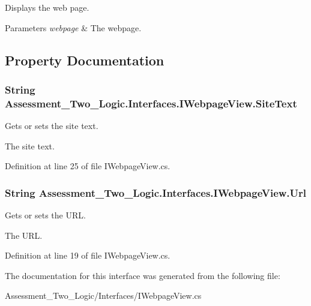Displays the web page. 


\begin{DoxyParams}{Parameters}
{\em webpage} & The webpage.\\
\hline
\end{DoxyParams}


\subsection{Property Documentation}
\hypertarget{interface_assessment___two___logic_1_1_interfaces_1_1_i_webpage_view_af20fba7f4d0ebaa5ac4dd52a4773e784}{
\subsubsection[{SiteText}]{\setlength{\rightskip}{0pt plus 5cm}String Assessment\_\-Two\_\-Logic.Interfaces.IWebpageView.SiteText}}
\label{interface_assessment___two___logic_1_1_interfaces_1_1_i_webpage_view_af20fba7f4d0ebaa5ac4dd52a4773e784}


Gets or sets the site text. 

The site text.

Definition at line 25 of file IWebpageView.cs.

\hypertarget{interface_assessment___two___logic_1_1_interfaces_1_1_i_webpage_view_acd1fa4bb8ce9b39bac77fcb9568a9f52}{
\subsubsection[{Url}]{\setlength{\rightskip}{0pt plus 5cm}String Assessment\_\-Two\_\-Logic.Interfaces.IWebpageView.Url}}
\label{interface_assessment___two___logic_1_1_interfaces_1_1_i_webpage_view_acd1fa4bb8ce9b39bac77fcb9568a9f52}


Gets or sets the URL. 

The URL.

Definition at line 19 of file IWebpageView.cs.



The documentation for this interface was generated from the following file:\begin{DoxyCompactItemize}
\item 
Assessment\_\-Two\_\-Logic/Interfaces/IWebpageView.cs\end{DoxyCompactItemize}
